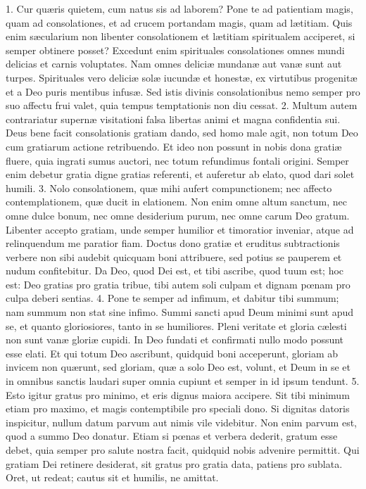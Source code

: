 \documentclass[twoside]{article}
\begin{document}
1. Cur quæris quietem, cum natus sis ad laborem? Pone te ad patientiam magis, quam ad consolationes, et ad crucem portandam magis, quam ad lætitiam. Quis enim sæcularium non libenter consolationem et lætitiam spiritualem acciperet, si semper obtinere posset? Excedunt enim spirituales consolationes omnes mundi delicias et carnis voluptates. Nam omnes deliciæ mundanæ aut vanæ sunt aut turpes. Spirituales vero deliciæ solæ iucundæ et honestæ, ex virtutibus progenitæ et a Deo puris mentibus infusæ. Sed istis divinis consolationibus nemo semper pro suo affectu frui valet, quia tempus temptationis non diu cessat.
2. Multum autem contrariatur supernæ visitationi falsa libertas animi et magna confidentia sui. Deus bene facit consolationis gratiam dando, sed homo male agit, non totum Deo cum gratiarum actione retribuendo. Et ideo non possunt in nobis dona gratiæ fluere, quia ingrati sumus auctori, nec totum refundimus fontali origini. Semper enim debetur gratia digne gratias referenti, et auferetur ab elato, quod dari solet humili.
3. Nolo consolationem, quæ mihi aufert compunctionem; nec affecto contemplationem, quæ ducit in elationem. Non enim omne altum sanctum, nec omne dulce bonum, nec omne desiderium purum, nec omne carum Deo gratum. Libenter accepto gratiam, unde semper humilior et timoratior inveniar, atque ad relinquendum me paratior fiam. Doctus dono gratiæ et eruditus subtractionis verbere non sibi audebit quicquam boni attribuere, sed potius se pauperem et nudum confitebitur. Da Deo, quod Dei est, et tibi ascribe, quod tuum est; hoc est: Deo gratias pro gratia tribue, tibi autem soli culpam et dignam pœnam pro culpa deberi sentias.
4. Pone te semper ad infimum, et dabitur tibi summum; nam summum non stat sine infimo. Summi sancti apud Deum minimi sunt apud se, et quanto gloriosiores, tanto in se humiliores. Pleni veritate et gloria cælesti non sunt vanæ gloriæ cupidi. In Deo fundati et confirmati nullo modo possunt esse elati. Et qui totum Deo ascribunt, quidquid boni acceperunt, gloriam ab invicem non quærunt, sed gloriam, quæ a solo Deo est, volunt, et Deum in se et in omnibus sanctis laudari super omnia cupiunt et semper in id ipsum tendunt.
5. Esto igitur gratus pro minimo, et eris dignus maiora accipere. Sit tibi minimum etiam pro maximo, et magis contemptibile pro speciali dono. Si dignitas datoris inspicitur, nullum datum parvum aut nimis vile videbitur. Non enim parvum est, quod a summo Deo donatur. Etiam si pœnas et verbera dederit, gratum esse debet, quia semper pro salute nostra facit, quidquid nobis advenire permittit. Qui gratiam Dei retinere desiderat, sit gratus pro gratia data, patiens pro sublata. Oret, ut redeat; cautus sit et humilis, ne amittat.
\end{document}
